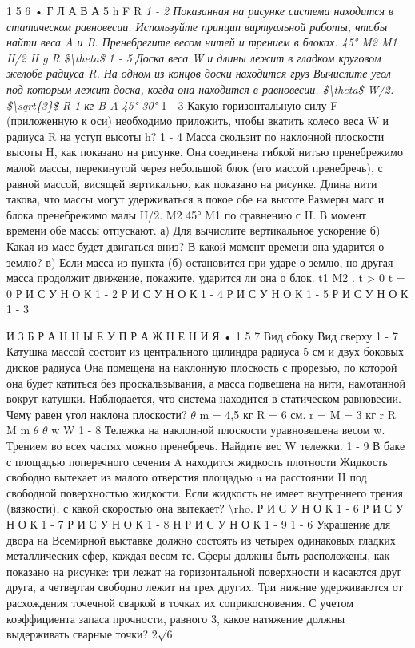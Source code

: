 \documentclass[10pt,oneside]{article}
\begin{document}
1 5 6 • Г Л А В А  5 h F R \emph{ 1 - 2 Показанная на рисунке система находится в статическом равновесии. Используйте принцип виртуальной работы, чтобы найти веса A и B. Пренебрегите весом нитей и трением в блоках. 45° M2 M1 H/2 H g R \$\textbackslash{}theta\$ } \emph{ 1 - 5 Доска веса W и длины лежит в гладком круговом желобе радиуса R. На одном из концов доски находится груз Вычислите угол под которым лежит доска, когда она находится в равновесии. \$\textbackslash{}theta\$ W/2. \$\textbackslash{}sqrt\{3\}\$ R 1 кг B A 45° 30° } 1 - 3 Какую горизонтальную силу F (приложенную к оси) необходимо приложить, чтобы вкатить колесо веса W и радиуса R на уступ высоты h? \emph{ } 1 - 4 Масса скользит по наклонной плоскости высоты H, как показано на рисунке. Она соединена гибкой нитью пренебрежимо малой массы, перекинутой через небольшой блок (его массой пренебречь), с равной массой, висящей вертикально, как показано на рисунке. Длина нити такова, что массы могут удерживаться в покое обе на высоте Размеры масс и блока пренебрежимо малы H/2. M2 45° M1 по сравнению с H. В момент времени обе массы отпускают. а) Для вычислите вертикальное ускорение б) Какая из масс будет двигаться вниз? В какой момент времени она ударится о землю? в) Если масса из пункта (б) остановится при ударе о землю, но другая масса продолжит движение, покажите, ударится ли она о блок. t1 M2 . t > 0 t = 0 Р И С У Н О К  1 - 2 Р И С У Н О К  1 - 4 Р И С У Н О К  1 - 5 Р И С У Н О К  1 - 3\par

И З Б Р А Н Н Ы Е  У П Р А Ж Н Е Н И Я • 1 5 7 Вид сбоку Вид сверху \emph{ } 1 - 7 Катушка массой состоит из центрального цилиндра радиуса 5 см и двух боковых дисков радиуса Она помещена на наклонную плоскость с прорезью, по которой она будет катиться без проскальзывания, а масса подвешена на нити, намотанной вокруг катушки. Наблюдается, что система находится в статическом равновесии. Чему равен угол наклона плоскости? \(\theta\) m = 4,5 кг R = 6 см. r = M = 3 кг r R M m \(\theta\) \(\theta\) w W \emph{ } 1 - 8 Тележка на наклонной плоскости уравновешена весом w. Трением во всех частях можно пренебречь. Найдите вес W тележки. \emph{ } 1 - 9 В баке с площадью поперечного сечения A находится жидкость плотности Жидкость свободно вытекает из малого отверстия площадью a на расстоянии H под свободной поверхностью жидкости. Если жидкость не имеет внутреннего трения (вязкости), с какой скоростью она вытекает? \textbackslash{}rho. Р И С У Н О К  1 - 6 Р И С У Н О К  1 - 7 Р И С У Н О К  1 - 8 H Р И С У Н О К  1 - 9 \emph{ } 1 - 6 Украшение для двора на Всемирной выставке должно состоять из четырех одинаковых гладких металлических сфер, каждая весом тс. Сферы должны быть расположены, как показано на рисунке: три лежат на горизонтальной поверхности и касаются друг друга, а четвертая свободно лежит на трех других. Три нижние удерживаются от расхождения точечной сваркой в точках их соприкосновения. С учетом коэффициента запаса прочности, равного 3, какое натяжение должны выдерживать сварные точки? \(2\sqrt{6}\)\par
\end{document}
